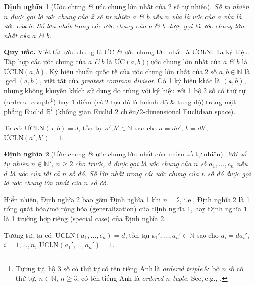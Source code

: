 \documentclass{article}
\numberwithin{equation}{section}
\newtheorem{dinhnghia}{Định nghĩa}[section]
\begin{document}
\begin{dinhnghia}[Ước chung \textit{\&} ước chung lớn nhất của 2 số tự nhiên]
	\label{def: ước chung 2 số}
	Số tự nhiên $n$ được gọi là \emph{ước chung} của 2 số tự nhiên $a$ \textit{\&} $b$ nếu $n$ vừa là ước của $a$ vừa là ước của $b$. Số lớn nhất trong các ước chung của $a$ \textit{\&} $b$ được gọi là \emph{ước chung lớn nhất} của $a$ \textit{\&} $b$.
\end{dinhnghia}
\noindent\textbf{Quy ước.} Viết tắt ước chung là ƯC \textit{\&} ước chung lớn nhất là ƯCLN. Ta ký hiệu: Tập hợp các ước chung của $a$ \textit{\&} $b$ là $\mbox{ƯC}(a,b)$; ước chung lớn nhất của $a$ \textit{\&} $b$ là $\mbox{ƯCLN}(a,b)$. Ký hiệu chuẩn quốc tế của ước chung lớn nhất của 2 số $a,b\in\mathbb{N}$ là $\gcd(a,b)$, viết tắt của \textit{greatest common divisor}. Có 1 ký hiệu khác là $(a,b)$, nhưng không khuyến khích sử dụng do trùng với ký hiệu với 1 bộ 2 số có thứ tự (ordered couple\footnote{Tương tự, bộ 3 số có thứ tự có tên tiếng Anh là \textit{ordered triple} \& bộ $n$ số có thứ tự, $n\in\mathbb{N}$, $n\ge 3$, có tên tiếng Anh là \textit{ordered $n$-tuple}. See, e.g., \cite{Rudin1976}.}) hay 1 điểm (có 2 tọa độ là hoành độ \& tung độ) trong mặt phẳng Euclid $\mathbb{R}^2$ (không gian Euclid 2 chiều\texttt{/}2-dimensional Euclidean space).

Ta có: $\mbox{ƯCLN}(a,b)= d$, tồn tại $a',b'\in\mathbb{N}$ sao cho $a = da'$, $b = db'$, $\mbox{ƯCLN}(a',b') = 1$.

\begin{dinhnghia}[Ước chung \textit{\&} ước chung lớn nhất của nhiều số tự nhiên]
	\label{def: ước chung nhiều số}
	Với số tự nhiên $n\in\mathbb{N}^\star$, $n\ge 2$ cho trước, $d$ được gọi là \emph{ước chung} của $n$ số $a_1,\ldots,a_n$ nếu $d$ là ước của tất cả $n$ số đó. Số lớn nhất trong các ước chung của $n$ số đó được gọi là \emph{ước chung lớn nhất} của $n$ số đó.
\end{dinhnghia}
Hiển nhiên, Định nghĩa \ref{def: ước chung nhiều số} bao gồm Định nghĩa \ref{def: ước chung 2 số} khi $n = 2$, i.e., Định nghĩa \ref{def: ước chung nhiều số} là 1 tổng quát hóa\texttt{/}mở rộng hóa (generalization) của Định nghĩa \ref{def: ước chung 2 số}, hay Định nghĩa \ref{def: ước chung 2 số} là 1 trường hợp riêng (special case) của Định nghĩa \ref{def: ước chung nhiều số}.

Tương tự, ta có: $\mbox{ƯCLN}(a_1,\ldots,a_n)= d$, tồn tại $a_1',\ldots,a_n'\in\mathbb{N}$ sao cho $a_i = da_i'$, $i = 1,\ldots, n$, $\mbox{ƯCLN}(a_1',\ldots,a_n') = 1$.
\end{document}
